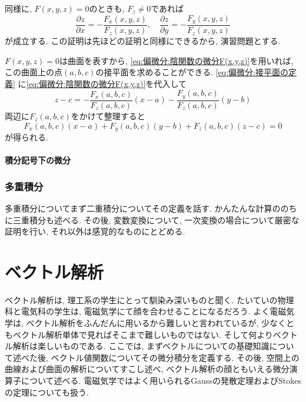 \documentclass[a4j,dvipdfmx]{jsarticle}
\numberwithin{equation}{section}
\begin{document}
            同様に, $F(x,y,z)=0$のときも, $F_z\neq 0$であれば
            \begin{equation}
                \frac{\partial z}{\partial x} = -\frac{F_{x}(x,y,z)}{F_z(x,y,z)},\quad \frac{\partial z}{\partial y}=-\frac{F_{y}(x,y,z)}{F_{z}(x,y,z)} \label{eq:偏微分:陰関数の微分F(x,y,z)}
            \end{equation}
            が成立する. この証明は先ほどの証明と同様にできるから, 演習問題とする.

            $F(x,y,z)=0$は曲面を表すから, \eqref{eq:偏微分:陰関数の微分F(x,y,z)}を用いれば, この曲面上の点$(a,b,c)$の接平面を求めることができる. \eqref{eq:偏微分:接平面の定義} に\eqref{eq:偏微分:陰関数の微分F(x,y,z)}を代入して
            \begin{equation*}
                z-c=-\frac{F_x(a,b,c)}{F_z(a,b,c)}(x-a)-\frac{F_y(a,b,c)}{F_z(a,b,c)}(y-b)
            \end{equation*}
            両辺に$F_z(a,b,c)$をかけて整理すると
            \begin{equation}
                F_x(a,b,c)(x-a)+F_y(a,b,c)(y-b)+F_z(a,b,c)(z-c)=0 \label{eq:偏微分:陰関数の接平面}
            \end{equation}
            が得られる.
        \clearpage
        \subsection{積分記号下の微分}

            
    \clearpage
    \section{多重積分}
        多重積分についてまず二重積分についてその定義を話す. かんたんな計算ののちに三重積分も述べる. その後, 変数変換について, 一次変換の場合について厳密な証明を行い, 
        それ以外は感覚的なものにとどめる.

    \clearpage
    
    \part{ベクトル解析}
    \begin{screen}
        ベクトル解析は, 理工系の学生にとって馴染み深いものと聞く. たいていの物理科と電気科の学生は, 電磁気学にて顔を合わせることになるだろう.
        よく電磁気学は, ベクトル解析をふんだんに用いるから難しいと言われているが, 少なくともベクトル解析単体で見ればそこまで難しいものではない. 
        そして何よりベクトル解析は楽しいものである. ここでは, まずベクトルについての基礎知識について述べた後, ベクトル値関数についてその微分積分を定義する.
        その後, 空間上の曲線および曲面の解析についてすこし述べ, ベクトル解析の顔ともいえる微分演算子について述べる.
        電磁気学ではよく用いられるGaussの発散定理およびStokesの定理についても扱う. 
    \end{screen}
    \clearpage
\end{document}
